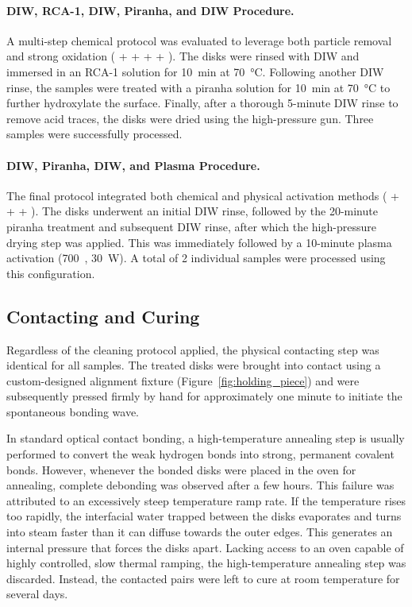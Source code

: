 \paragraph{DIW, RCA-1, DIW, Piranha, and DIW Procedure.}
A multi-step chemical protocol was evaluated to leverage both particle
removal and strong oxidation ( +  +  + 
+ ). The disks were rinsed with DIW and immersed in an RCA-1 solution
for \SI{10}{\minute} at \SI{70}{\celsius}. Following another DIW rinse, the
samples were treated with a piranha solution for \SI{10}{\minute} at
\SI{70}{\celsius} to further hydroxylate the surface. Finally, after a
thorough 5-minute DIW rinse to remove acid traces, the disks were dried using
the high-pressure  gun. Three samples were successfully processed.

\paragraph{DIW, Piranha, DIW, and Plasma Procedure.}
The final protocol integrated both chemical and physical activation methods
( +  +  + ). The disks underwent an
initial DIW rinse, followed by the 20-minute piranha treatment and subsequent
DIW rinse, after which the high-pressure  drying step was applied. This
was immediately followed by a 10-minute  plasma activation
(700~, \SI{30}{\watt}). A total of 2 individual samples were
processed using this configuration.

\subsection{Contacting and Curing}
Regardless of the cleaning protocol applied, the physical contacting step was
identical for all samples. The treated disks were brought into contact using
a custom-designed alignment fixture (Figure~\ref{fig:holding_piece}) and were
subsequently pressed firmly by hand for approximately one minute to initiate
the spontaneous bonding wave.

In standard optical contact bonding, a high-temperature annealing step is
usually performed to convert the weak hydrogen bonds into strong, permanent
covalent bonds. However, whenever the bonded disks were placed in
the oven for annealing, complete debonding was observed after a few
hours. This failure was attributed to an excessively steep temperature ramp
rate. If the temperature rises too rapidly, the interfacial water trapped
between the disks evaporates and turns into steam faster than it can diffuse
towards the outer edges. This generates an internal pressure that
forces the disks apart. Lacking access to an oven capable of highly
controlled, slow thermal ramping, the high-temperature annealing step was
discarded. Instead, the contacted pairs were left to cure at room temperature
for several days.

